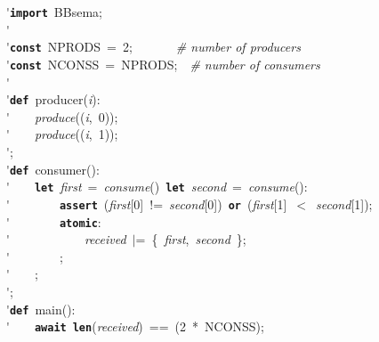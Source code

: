 \'\>\texttt{\textbf{import}}~BBsema;\\

\'\>\\

\'\>\texttt{\textbf{const}}~NPRODS~=~2;~~~~~~~\emph{\# number of producers}\\

\'\>\texttt{\textbf{const}}~NCONSS~=~NPRODS;~~\emph{\# number of consumers}\\

\'\>\\

\'\>\texttt{\textbf{def}}~producer(\textit{i}):\\

\'\>~~~~\textit{produce}((\textit{i},~0));\\

\'\>~~~~\textit{produce}((\textit{i},~1));\\

\'\>;\\

\'\>\texttt{\textbf{def}}~consumer():\\

\'\>~~~~\texttt{\textbf{let}}~\textit{first}~=~\textit{consume}()~\texttt{\textbf{let}}~\textit{second}~=~\textit{consume}():\\

\'\>~~~~~~~~\texttt{\textbf{assert}}~(\textit{first}[0]~!=~\textit{second}[0])~\texttt{\textbf{or}}~(\textit{first}[1]~$<$~\textit{second}[1]);\\

\'\>~~~~~~~~\texttt{\textbf{atomic}}:\\

\'\>~~~~~~~~~~~~\textit{received}~$\vert$=~\{~\textit{first},~\textit{second}~\};\\

\'\>~~~~~~~~;\\

\'\>~~~~;\\

\'\>;\\

\'\>\texttt{\textbf{def}}~main():\\

\'\>~~~~\texttt{\textbf{await}}~\texttt{\textbf{len}}(\textit{received})~==~(2~*~NCONSS);\\

